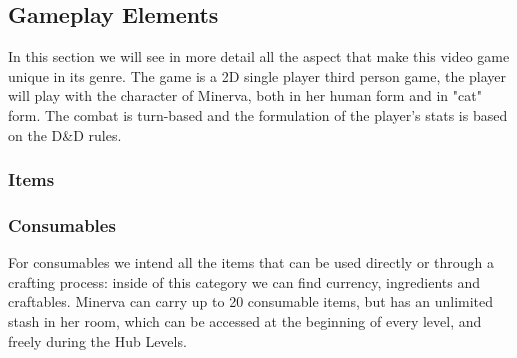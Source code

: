 \subsection{Gameplay Elements}

In this section we will see in more detail all the aspect that make this video game unique in its genre. The game is a 2D single player third person game, the player will play with the character of Minerva, both in her human form and in "cat" form. The combat is turn-based and the formulation of the player's stats is based on the D\&D rules.



\subsubsection{Items}













\pagebreak
\subsubsection{Consumables}
For consumables we intend all the items that can be used directly or through a crafting process: inside of this category we can find currency, ingredients and craftables. Minerva can carry up to 20 consumable items, but has an unlimited stash in her room, which can be accessed at the beginning of every level, and freely during the Hub Levels. \\







